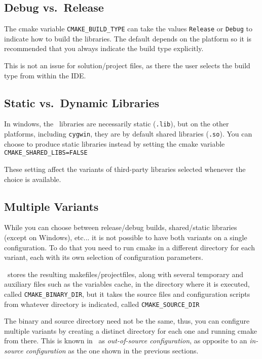 \subsection{Debug vs.\ Release}

The cmake variable \texttt{CMAKE\_BUILD\_TYPE} can take the values \texttt{Release} or \texttt{Debug} to indicate how to build
the libraries. The default depends on the platform so it is recommended that you always indicate the build type explicitly.

This is not an issue for solution/project files, as there the user selects the build type from within the IDE.

\subsection{Static vs.\ Dynamic Libraries }

In windows, the \cgal\ libraries are necessarily static
({\tt .lib}), but on the other platforms, including \texttt{cygwin}, they are by default shared libraries ({\tt .so}).
You can choose to produce static libraries instead by setting the cmake variable {\tt CMAKE\_SHARED\_LIBS=FALSE} 

These setting affect the variants of third-party libraries selected whenever the choice is available.

\subsection{Multiple Variants}\label{sec:cmake-out-of-source}

While you can choose between release/debug builds, shared/static libraries
(except on Windows), etc...
it is not possible to have both variants on a single configuration. To do that you need to run cmake in a 
different directory for each variant, each with its own selection of configuration parameters.

\cmake\ stores the resulting makefiles/projectfiles, along with several temporary and auxiliary files such
as the variables cache, in the directory where it is executed, called \texttt{CMAKE\_BINARY\_DIR}, but it
takes the source files and configuration scripts from whatever directory is indicated, called
\texttt{CMAKE\_SOURCE\_DIR} 

The binary and source directory need not be the same, thus, you can configure multiple variants by creating a
distinct directory for each one and running cmake from there. This is known in \cmake\ as 
{\em out-of-source configuration}, as opposite to an {\em in-source configuration} as the one shown in the 
previous sections.

